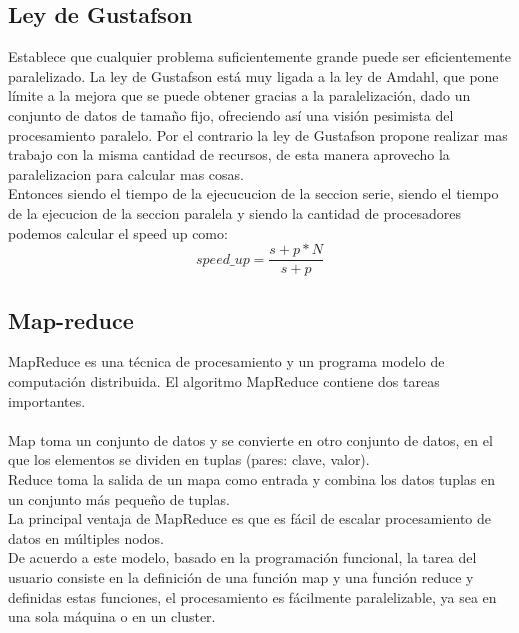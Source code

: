 \subsection{Ley de Gustafson}

Establece que cualquier problema suficientemente grande puede ser eficientemente
paralelizado. La ley de Gustafson está muy ligada a la ley de Amdahl, que pone
límite a la mejora que se puede obtener gracias a la paralelización, dado un
conjunto de datos de tamaño fijo, ofreciendo así una visión pesimista del
procesamiento paralelo. Por el contrario la ley de Gustafson  propone realizar
mas trabajo con la misma cantidad de recursos, de esta manera aprovecho la
paralelizacion para calcular mas cosas.\\

Entonces siendo  el tiempo de la ejecucucion de la seccion serie, siendo
 el tiempo de la ejecucion de la seccion paralela y siendo  la
cantidad de procesadores podemos calcular el speed up como:
\begin{equation}
    speed\_up = \dfrac{s+p*N}{s+p}
\end{equation}

\subsection{Map-reduce}

MapReduce es una técnica de procesamiento y un programa modelo de computación
distribuida. El algoritmo MapReduce contiene dos tareas importantes.\\\\
Map toma un conjunto de datos y se convierte en otro conjunto de datos, en el
que los elementos se dividen en tuplas (pares: clave, valor).\\

Reduce toma la salida de un mapa como entrada y combina los datos tuplas en un
conjunto más pequeño de tuplas.\\

La principal ventaja de MapReduce es que es fácil de escalar procesamiento de
datos en múltiples nodos.\\

De acuerdo a este modelo, basado en la programación funcional, la tarea del
usuario consiste en la definición de una función map y una función reduce y
definidas estas funciones, el procesamiento es fácilmente paralelizable, ya sea
en una sola máquina o en un cluster.\\
